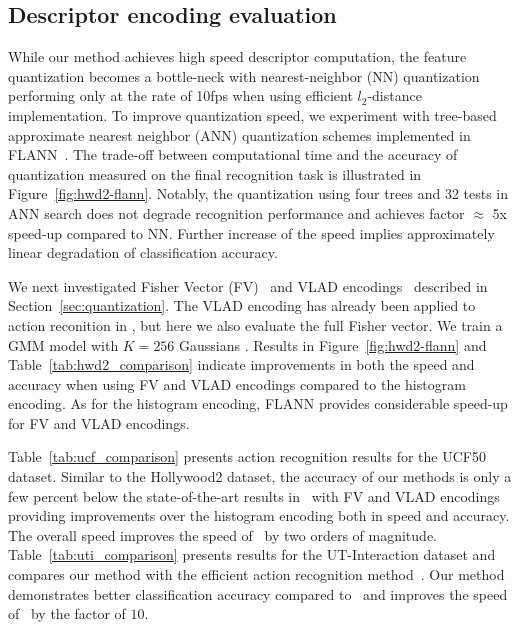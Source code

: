 \documentclass[10pt,twocolumn,letterpaper]{article}
\begin{document}
\subsection{Descriptor encoding evaluation}
\label{subsec:descencimprov}
While our method achieves high speed descriptor computation, the feature quantization becomes a bottle-neck with nearest-neighbor (NN) quantization performing only at the rate of 10fps when using efficient $l_2$-distance implementation. To improve quantization speed, we experiment with tree-based approximate nearest neighbor (ANN) quantization schemes implemented in FLANN~\cite{Muja09}. The trade-off between computational time and the accuracy of quantization measured on the final recognition task is illustrated in Figure~\ref{fig:hwd2-flann}. Notably, the quantization using four trees and 32 tests in ANN search does not degrade recognition performance and achieves factor $\approx$ 5x speed-up compared to NN. Further increase of the speed implies approximately linear degradation of classification accuracy. 

We next investigated Fisher Vector (FV)~\cite{Perronnin12} and VLAD encodings~\cite{Jegou10} described in Section~\ref{sec:quantization}. 
%
The VLAD encoding has already been applied to action reconition in \cite{jain13}, but here we also evaluate the full Fisher vector. We train a GMM model with $K=256$ Gaussians \cite{Jegou12}. Results in Figure~\ref{fig:hwd2-flann} and Table~\ref{tab:hwd2_comparison} indicate improvements in both the speed and accuracy when using FV and VLAD encodings compared to the histogram encoding. As for the histogram encoding, FLANN provides considerable speed-up for FV and VLAD encodings.

Table~\ref{tab:ucf_comparison} presents action recognition results for the UCF50 dataset. Similar to the Hollywood2 dataset, the accuracy of our methods is only a few percent below the state-of-the-art results in~\cite{Wang12} with FV and VLAD encodings providing improvements over the histogram encoding both in speed and accuracy. The overall speed improves the speed of~\cite{Wang12} by two orders of magnitude. Table~\ref{tab:uti_comparison} presents results for the UT-Interaction dataset and compares our method with the efficient action recognition method~\cite{Yu10}. Our method demonstrates better classification accuracy compared to~\cite{Yu10} and improves the speed of~\cite{Yu10} by the factor of $10$.
\end{document}
